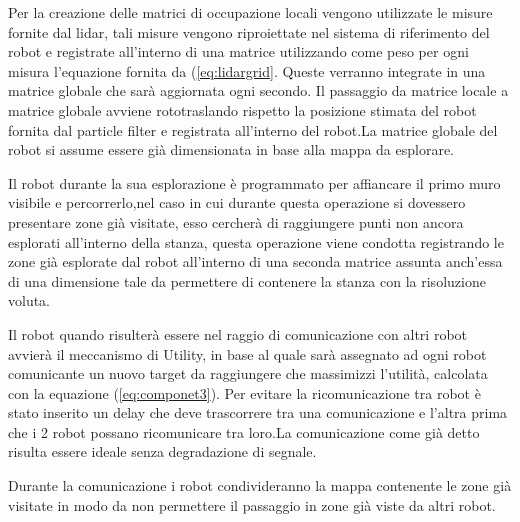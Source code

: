 Per la creazione delle matrici di occupazione locali vengono utilizzate le misure 
fornite dal lidar, tali misure vengono riproiettate nel sistema di riferimento del robot 
e registrate all'interno di una matrice utilizzando come peso per ogni misura l'equazione
fornita da (\ref{eq:lidargrid}.
Queste verranno integrate in una matrice globale che sarà aggiornata ogni secondo. Il
passaggio da matrice locale a matrice globale avviene rototraslando rispetto la posizione
stimata del robot fornita dal particle filter e registrata all'interno del robot.La matrice 
globale del robot si assume essere già dimensionata in base alla mappa da esplorare.

Il robot durante la sua esplorazione è programmato per affiancare il primo muro visibile e 
percorrerlo,nel caso in cui durante questa operazione si dovessero presentare zone già visitate,
esso cercherà di raggiungere punti non ancora esplorati all'interno della stanza, questa operazione
viene condotta registrando le zone già esplorate dal robot all'interno di una seconda matrice assunta
anch'essa di una dimensione tale da permettere di contenere la stanza con la risoluzione voluta.


Il robot quando risulterà essere nel raggio di comunicazione con altri robot avvierà il meccanismo di Utility,
in base al quale sarà assegnato ad ogni robot comunicante un nuovo target da raggiungere che massimizzi 
l'utilità, calcolata con la equazione (\ref{eq:componet3}). Per evitare la ricomunicazione tra robot è stato 
inserito un delay che deve trascorrere tra una comunicazione e l'altra prima che i 2 robot possano ricomunicare 
tra loro.La comunicazione come già detto risulta essere ideale senza degradazione di segnale.

Durante la comunicazione i robot condivideranno la mappa contenente le zone già visitate in modo da
non permettere il passaggio in zone già viste da altri robot.